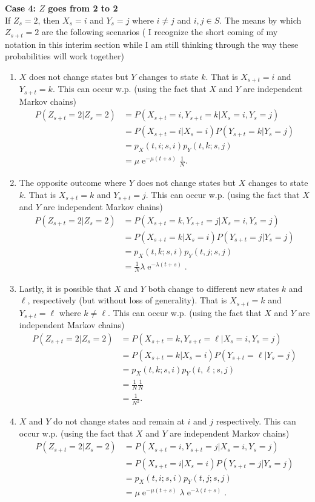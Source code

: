 \documentclass[10pt]{amsart}
\DeclareMathOperator{\E}{e}
\begin{document}
\noindent
\textbf{Case 4: $Z$ goes from 2 to 2} \\
If $Z_s = 2$, then $X_s = i$ and $Y_s = j$ where $i \neq j$ and $i, j \in S$.
The means by which $Z_{s + t} = 2$ are the following scenarios ( I recognize the short coming of my notation in this interim section while I am still thinking through the way these probabilities will work together)
\begin{enumerate}
\item $X$ does not change states but $Y$ changes to state $k$.
That is $X_{s + t} = i$ and $Y_{s + t} = k$.
This can occur w.p. (using the fact that $X$ and $Y$ are independent Markov chains)
\begin{align*}
P(Z_{s + t} = 2 | Z_s = 2)
	&= P(X_{s + t} = i,Y_{s + t} = k | X_s = i,Y_s = j) \\
	&= P(X_{s + t} = i| X_s = i)P(Y_{s + t} = k | Y_s = j) \\
	&= p_X(t,i;s,i) p_Y(t,k;s,j) \\
	&=  \mu\E^{-\mu(t + s)}  \frac 1 N.
\end{align*}
\item The opposite outcome where $Y$ does not change states but $X$ changes to state $k$.
That is $X_{s + t} = k$ and $Y_{s + t} = j$.
This can occur w.p. (using the fact that $X$ and $Y$ are independent Markov chains)
\begin{align*}
P(Z_{s + t} = 2 | Z_s = 2)
	&= P(X_{s + t} = k,Y_{s + t} = j | X_s = i,Y_s = j) \\
	&= P(X_{s + t} = k| X_s = i)P(Y_{s + t} = j | Y_s = j) \\
	&= p_X(t,k;s,i)p_Y(t,j;s,j) \\
	&= \frac 1 N  \lambda\E^{-\lambda(t + s)} .
\end{align*}
\item Lastly, it is possible that $X$ and $Y$ both change to different new states $k$ and $\ell$, respectively (but without loss of generality).
That is $X_{s + t} = k$ and $Y_{s + t} = \ell$ where $k \neq \ell$.
This can occur w.p. (using the fact that $X$ and $Y$ are independent Markov chains)
\begin{align*}
P(Z_{s + t} = 2 | Z_s = 2)
	&= P(X_{s + t} = k,Y_{s + t} = \ell | X_s = i,Y_s = j) \\
	&= P(X_{s + t} = k| X_s = i)P(Y_{s + t} = \ell | Y_s = j) \\
	&= p_X(t,k;s,i)p_Y(t,\ell;s,j) \\
	&= \frac 1 N \frac 1 N \\
	&= \frac 1 {N^2}.
\end{align*}
\item $X$ and $Y$ do not change states and remain at $i$ and $j$ respectively.
This can occur w.p. (using the fact that $X$ and $Y$ are independent Markov chains)
\begin{align*}
P(Z_{s + t} = 2 | Z_s = 2)
	&= P(X_{s + t} = i,Y_{s + t} = j | X_s = i,Y_s = j) \\
	&= P(X_{s + t} = i| X_s = i)P(Y_{s + t} = j | Y_s = j) \\
	&= p_X(t,i;s,i) p_Y(t,j;s,j) \\
	&= \mu\E^{-\mu(t + s)} \lambda\E^{-\lambda(t + s)}.
\end{align*}
\end{enumerate}
\end{document}
